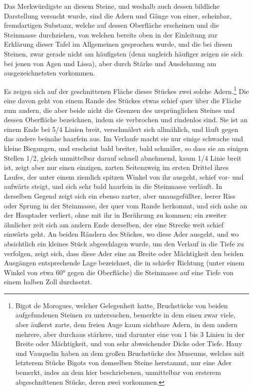 \documentclass[a4paper, 11pt, oneside, german]{article}
\begin{document}
Das Merkwürdigste an diesem Steine, und weshalb auch dessen bildliche Darstellung versucht wurde, sind die Adern und Gänge von einer, scheinbar, fremdartigen Substanz, welche auf dessen Oberfläche erscheinen und die Steinmasse durchziehen, von welchen bereits oben in der Einleitung zur Erklärung dieser Tafel im Allgemeinen gesprochen wurde, und die bei diesen Steinen, zwar gerade nicht am häufigsten (denn ungleich häufiger zeigen sie sich bei jenen von Agen und Lissa), aber durch Stärke und Ausdehnung am ausgezeichnetsten vorkommen.

Es zeigen sich auf der geschnittenen Fläche dieses Stückes zwei solche Adern.\footnote{Bigot de Morogues, welcher Gelegenheit hatte, Bruchstücke von beiden aufgefundenen Steinen zu untersuchen, bemerkte in dem einen zwar viele, aber äußerst zarte, dem freien Auge kaum sichtbare Adern, in dem andern mehrere, aber durchaus stärkere, und darunter eine von 1 bis 3 Linien in der Breite oder Mächtigkeit, und von sehr abweichender Dicke oder Tiefe. Hauy und Vauquelin haben an dem großen Bruchstücke des Museums, welches mit letzterem Stücke Bigots von demselben Steine herstammt, nur eine Ader bemerkt, indes an dem hier beschriebenen, unmittelbar von ersterem abgeschnittenen Stücke, deren zwei vorkommen.} Die eine davon geht von einem Rande des Stückes etwas schief quer über die Fläche zum andern, die aber beide nicht die Grenzen des ursprünglichen Steines und dessen Oberfläche bezeichnen, indem sie verbrochen und rindenlos sind. Sie ist an einem Ende bei 5/4 Linien breit, verschmälert sich allmählich, und läuft gegen das andere beinahe haarfein aus. Im Verlaufe macht sie nur einige schwache und kleine Biegungen, und erscheint bald breiter, bald schmäler, so dass sie an einigen Stellen 1/2, gleich unmittelbar darauf schnell abnehmend, kaum 1/4 Linie breit ist, zeigt aber nur einen einzigen, zarten Seitenzweig im ersten Drittel ihres Laufes, der unter einem ziemlich spitzen Winkel von ihr ausgeht, schief vor- und aufwärts steigt, und sich sehr bald haarfein in die Steinmasse verläuft. In derselben Gegend zeigt sich ein ebenso zarter, aber unausgefüllter, leerer Riss oder Sprung in der Steinmasse, der quer vom Rande herkommt, und sich nahe an der Hauptader verliert, ohne mit ihr in Berührung zu kommen; ein zweiter ähnlicher zeit sich am andern Ende derselben, der eine Strecke weit schief einwärts geht. An beiden Rändern des Stückes, wo diese Ader ausgeht, und wo absichtlich ein kleines Stück abgeschlagen wurde, um den Verlauf in die Tiefe zu verfolgen, zeigt sich, dass diese Ader eine an Breite oder Mächtigkeit den beiden Ausgängen entsprechende Lage bezeichnet, die in schiefer Richtung (unter einem Winkel von etwa 60° gegen die Oberfläche) die Steinmasse auf eine Tiefe von einem halben Zoll durchsetzt.
\end{document}
